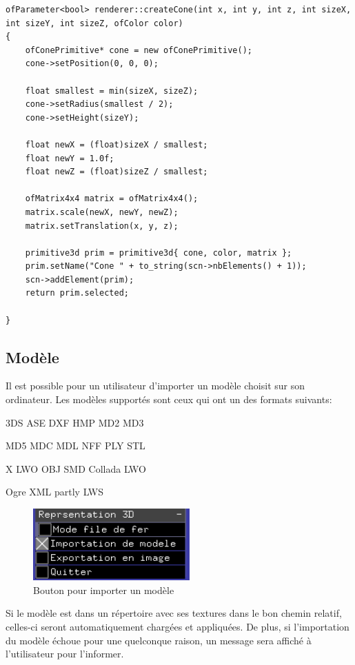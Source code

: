 \begin{lstlisting}
ofParameter<bool> renderer::createCone(int x, int y, int z, int sizeX, int sizeY, int sizeZ, ofColor color)
{
	ofConePrimitive* cone = new ofConePrimitive();
	cone->setPosition(0, 0, 0);
	
	float smallest = min(sizeX, sizeZ);
	cone->setRadius(smallest / 2);
	cone->setHeight(sizeY);
	
	float newX = (float)sizeX / smallest;
	float newY = 1.0f;
	float newZ = (float)sizeZ / smallest;
	
	ofMatrix4x4 matrix = ofMatrix4x4();
	matrix.scale(newX, newY, newZ);
	matrix.setTranslation(x, y, z);
	
	primitive3d prim = primitive3d{ cone, color, matrix };
	prim.setName("Cone " + to_string(scn->nbElements() + 1));
	scn->addElement(prim);
	return prim.selected;
	
}
\end{lstlisting}

\subsection{Modèle}

Il est possible pour un utilisateur d'importer un modèle choisit sur son ordinateur. Les modèles supportés sont ceux qui ont un des formats suivants:

\begin{list}{}{}
	\item 3DS \tab ASE \tab DXF \tab HMP \tab MD2 \tab MD3
	\item MD5 \tab MDC \tab MDL \tab NFF \tab PLY \tab STL 
	\item X \tab LWO \tab OBJ \tab SMD \tab Collada \tab LWO
	\item Ogre XML \tab partly LWS
\end{list}

\begin{figure}[h]
	\centering
	\includegraphics[width=6cm]{fig/importerModele.png}
	\caption{Bouton pour importer un modèle}
	\label{fig:test}
\end{figure}

Si le modèle est dans un répertoire avec ses textures dans le bon chemin relatif, celles-ci seront automatiquement chargées et appliquées. De plus, si l'importation du modèle échoue pour une quelconque raison, un message sera affiché à l'utilisateur pour l'informer.\\

